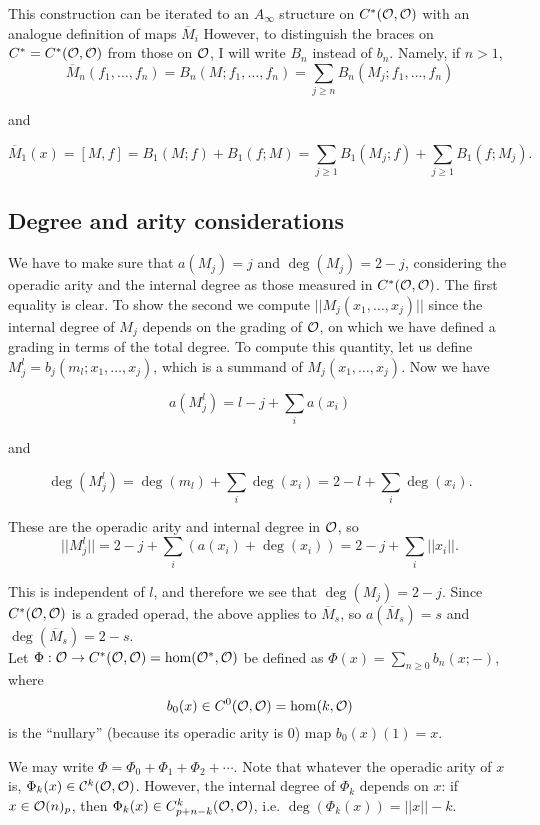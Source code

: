 \documentclass[twoside]{article}
\begin{document}
This construction can be iterated to an $A_\infty$ structure on $C^*({\mathcal O},{\mathcal O})$ with an analogue definition of maps $\overline{M}_i$ %
However, to distinguish the braces on $C^*=C^*({\mathcal O},{\mathcal O})$ from those on ${\mathcal O}$, I will write $B_n$ instead of $b_n$. Namely, if $n>1$,  
$$\overline{M}_n(f_1,\dots, f_n)=B_n(M;f_1,\dots, f_n)=\sum_{j\geq n} B_n(M_j;f_1,\dots, f_n)$$

and

$$\overline{M}_1(x)=[M,f]=B_1(M;f)+B_1(f;M)=\sum_{j\geq 1}B_1(M_j;f)+\sum_{j\geq 1}B_1(f;M_j).$$ 

\subsection{Degree and arity considerations}

We have to make sure that $a(M_j)=j$ and $\deg(M_j)=2-j$, considering the operadic arity and the internal degree as those measured in $C^*({\mathcal O},{\mathcal O})$. The first equality is clear. To show the second we compute $||M_j(x_1,\dots, x_j)||$ since the internal degree of $M_j$ depends on the grading of ${\mathcal O}$, on which we have defined a grading in terms of the total degree. To compute this quantity, let us define $M_j^l=b_j(m_l;x_1,\dots, x_j)$, which is a summand of $M_j(x_1,\dots, x_j)$. Now we have 

$$a(M_j^l)=l-j+\sum_i a(x_i)$$

and

$$\deg(M_j^l)=\deg(m_l)+\sum_i\deg(x_i)=2-l+\sum_i \deg(x_i).$$ 

These are the operadic arity and internal degree in ${\mathcal O}$, so $$||M_j^l||=2-j+\sum_i(a(x_i)+\deg(x_i))=2-j+\sum_i||x_i||.$$ 

This is independent of $l$, and therefore we see that $\deg(M_j)=2-j$. Since $C^*({\mathcal O},{\mathcal O})$ is a graded operad, the above applies to $\overline{M}_s$, so $a(\overline{M}_s)=s$ and $\deg(\overline{M}_s)=2-s$.\\

Let $\Phi:{\mathcal O}\to C^*({\mathcal O},{\mathcal O})=\hom({\mathcal O}^*,{\mathcal O})$ be defined as $\Phi(x)=\sum_{n\geq 0}b_n(x;-)$, where $$b_0(x)\in C^0({\mathcal O},{\mathcal O})=\hom(k,{\mathcal O})$$ is the ``nullary'' (because its operadic arity is 0) map $b_0(x)(1)=x$.  

We may write $\Phi=\Phi_0+\Phi_1+\Phi_2+\cdots$. Note that whatever the operadic arity of $x$ is, $\Phi_k(x)\in{\mathcal C}^k({\mathcal O},{\mathcal O})$. However, the internal degree of $\Phi_k$ depends on $x$: if $x\in{\mathcal O}(n)_p$, then $\Phi_k(x)\in C^k_{p+n-k}({\mathcal O},{\mathcal O})$, i.e. $\deg(\Phi_k(x))=||x||-k$. 
\end{document}
